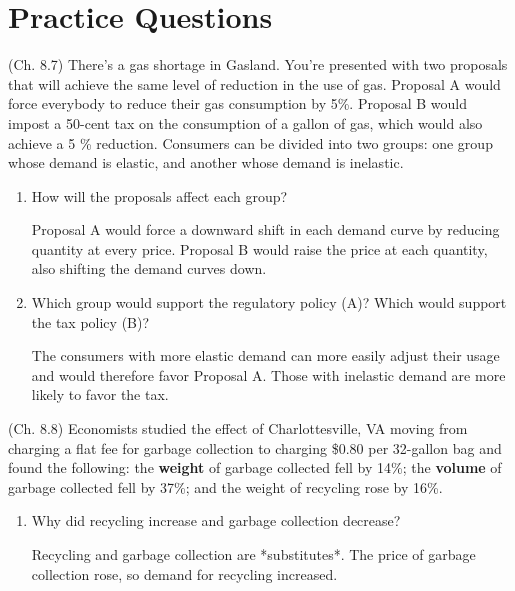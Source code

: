 \documentclass{exam}
\begin{document}
\section{Practice Questions}

\begin{questions}

\question (Ch. 8.7) There's a gas shortage in Gasland. You're presented with two proposals that will achieve the same level of reduction in the use  of gas. Proposal A would force everybody to reduce their gas consumption by 5\%. Proposal B would impost a 50-cent tax on the consumption of a gallon of gas, which would also achieve a 5 \% reduction. Consumers can be divided into two groups: one group whose demand is elastic, and another whose demand is inelastic.
\begin{enumerate}
\item How will the proposals affect each group?
\begin{solution} Proposal A would force a downward shift in each demand curve by reducing quantity at every price. Proposal B would raise the price at each quantity, also shifting the demand curves down. \end{solution}
\item Which group would support the regulatory policy (A)? Which would support the tax policy (B)?
\begin{solution} The consumers with more elastic demand can more easily adjust their usage and would therefore favor Proposal A. Those with inelastic demand are more likely to favor the tax. \end{solution}

\end{enumerate}

\vspace{15em}

\question (Ch. 8.8) Economists studied the effect of Charlottesville, VA moving from charging a flat fee for garbage collection to charging \$0.80 per 32-gallon bag and found the following: the \textbf{weight} of garbage collected fell by 14\%; the \textbf{volume} of garbage collected fell by 37\%; and the weight of recycling rose by 16\%.
\begin{enumerate}
\item Why did recycling increase and garbage collection decrease?
\begin{solution} Recycling and garbage collection are *substitutes*. The price of garbage collection rose, so demand for recycling increased. \end{solution}


\end{enumerate}
\end{questions}
\end{document}

